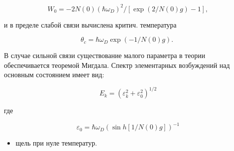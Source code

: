 \documentclass[10pt]{article}
\begin{document}
\[

W_{0}=-2 N(0)\left(\hbar \omega_{D}\right)^{2} /[\exp (2 / N(0) g)-1],

\]



и в пределе слабой связи вычислена критич. температура



\[

\theta_{c}=\hbar \omega_{D} \exp (-1 / N(0) g) \text {. }

\]



В случае сильной связи существование малого параметра в теории обеспечивается теоремой Мигдала. Спектр элементарных возбуждений над основным состоянием имеет вид:



\[

E_{k}=\left(\varepsilon_{k}^{2}+\varepsilon_{0}^{2}\right)^{1 / 2}

\]



где



\[

\varepsilon_{0}=\hbar \omega_{D}(\sin h[1 / N(0) g])^{-1}

\]



\begin{itemize}

  \item щель при нуле температур.

\end{itemize}
\end{document}

